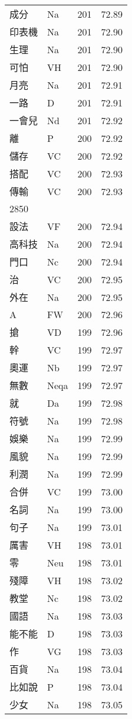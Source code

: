 \documentclass[twocolumn]{book}
\begin{document}
\begin{supertabular}{llrr}
成分 & Na & 201 &  72.89\\
印表機 & Na & 201 &  72.90\\
生理 & Na & 201 &  72.90\\
可怕 & VH & 201 &  72.90\\
月亮 & Na & 201 &  72.91\\
一路 & D & 201 &  72.91\\
一會兒 & Nd & 201 &  72.92\\
離 & P & 200 &  72.92\\
儲存 & VC & 200 &  72.92\\
搭配 & VC & 200 &  72.93\\
傳輸 & VC & 200 &  72.93\\
2850\\
設法 & VF & 200 &  72.94\\
高科技 & Na & 200 &  72.94\\
門口 & Nc & 200 &  72.94\\
治 & VC & 200 &  72.95\\
外在 & Na & 200 &  72.95\\
A & FW & 200 &  72.96\\
搶 & VD & 199 &  72.96\\
幹 & VC & 199 &  72.97\\
奧運 & Nb & 199 &  72.97\\
無數 & Neqa & 199 &  72.97\\
就 & Da & 199 &  72.98\\
符號 & Na & 199 &  72.98\\
娛樂 & Na & 199 &  72.99\\
風貌 & Na & 199 &  72.99\\
利潤 & Na & 199 &  72.99\\
合併 & VC & 199 &  73.00\\
名詞 & Na & 199 &  73.00\\
句子 & Na & 199 &  73.01\\
厲害 & VH & 198 &  73.01\\
零 & Neu & 198 &  73.01\\
殘障 & VH & 198 &  73.02\\
教堂 & Nc & 198 &  73.02\\
國語 & Na & 198 &  73.03\\
能不能 & D & 198 &  73.03\\
作 & VG & 198 &  73.03\\
百貨 & Na & 198 &  73.04\\
比如說 & P & 198 &  73.04\\
少女 & Na & 198 &  73.05\\

\end{supertabular}
\end{document}
